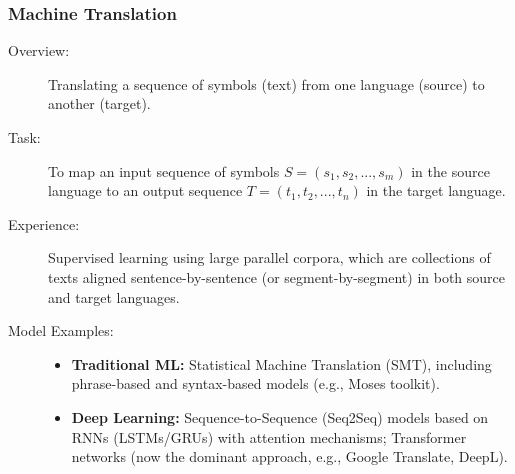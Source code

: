 \documentclass{article}
\begin{document}
\subsubsection{Machine Translation}
\begin{description}
    \item[Overview:] Translating a sequence of symbols (text) from one language (source) to another (target).
    \item[Task:] To map an input sequence of symbols $S = (s_1, s_2, ..., s_m)$ in the source language to an output sequence $T = (t_1, t_2, ..., t_n)$ in the target language.
    \item[Experience:] Supervised learning using large parallel corpora, which are collections of texts aligned sentence-by-sentence (or segment-by-segment) in both source and target languages.
    \item[Model Examples:]
        \begin{itemize}
            \item \textbf{Traditional ML:} Statistical Machine Translation (SMT), including phrase-based and syntax-based models (e.g., Moses toolkit).
            \item \textbf{Deep Learning:} Sequence-to-Sequence (Seq2Seq) models based on RNNs (LSTMs/GRUs) with attention mechanisms; Transformer networks (now the dominant approach, e.g., Google Translate, DeepL).
        \end{itemize}
\end{description}
\end{document}
